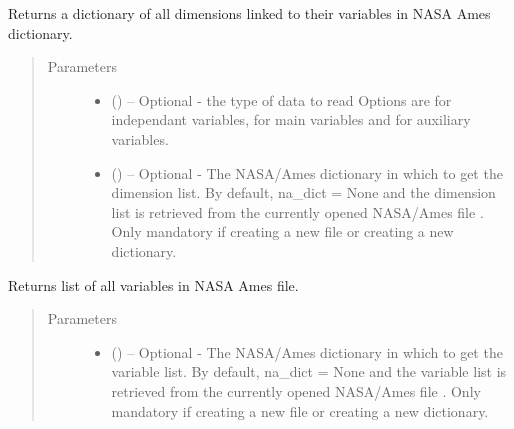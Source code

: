 \documentclass[a4paper,10pt,openany,english]{sphinxmanual}
\begin{document}
\begin{fulllineitems}
\begin{fulllineitems}
\end{fulllineitems}


\begin{fulllineitems}
\label{egadsapi:egads.input.nasa_ames_io.NasaAmes.get_dimension_list}
Returns a dictionary of all dimensions linked to their variables in NASA Ames dictionary.
\begin{quote}\begin{description}
\item[{Parameters}] \leavevmode\begin{itemize}
\item {} 
 () -- Optional - the type of data to read
Options are  for independant variables,  for main variables
and  for auxiliary variables.

\item {} 
 () -- Optional - The NASA/Ames dictionary in which to get the dimension list. By default, 
na\_dict = None and the dimension list is retrieved from the currently opened NASA/Ames 
file . Only mandatory if creating a new file or creating a new dictionary.

\end{itemize}

\end{description}\end{quote}

\end{fulllineitems}


\begin{fulllineitems}
\label{egadsapi:egads.input.nasa_ames_io.NasaAmes.get_variable_list}
Returns list of all variables in NASA Ames file.
\begin{quote}\begin{description}
\item[{Parameters}] \leavevmode\begin{itemize}
\item {} 
 () -- Optional - The NASA/Ames dictionary in which to get the variable list. By default, 
na\_dict = None and the variable list is retrieved from the currently opened NASA/Ames 
file . Only mandatory if creating a new file or creating a new dictionary.


\end{itemize}
\end{description}
\end{quote}
\end{fulllineitems}
\end{fulllineitems}
\end{document}
